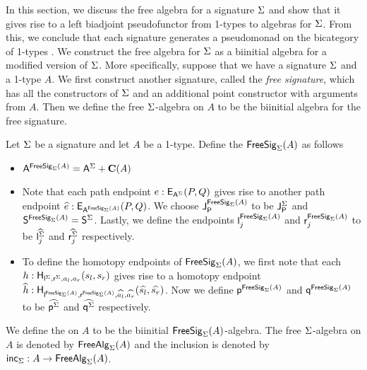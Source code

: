 In this section, we discuss the free algebra for a signature $\sign$ and show that it gives rise to a left biadjoint pseudofunctor from 1-types to algebras for $\sign$.
From this, we conclude that each signature generates a pseudomonad on the bicategory of 1-types \cite{LACK2000179}.
We construct the free algebra for $\sign$ as a biinitial algebra for a modified version of $\sign$.
More specifically, suppose that we have a signature $\sign$ and a 1-type $A$.
We first construct another signature, called the \emph{free signature}, which has all the constructors of $\sign$ and an additional point constructor with arguments from $A$.
Then we define the free $\sign$-algebra on $A$ to be the biinitial algebra for the free signature.

\begin{definition}\label{def:free_alg}
Let $\sign$ be a signature and let $A$ be a 1-type.
Define the  $\freesign{\sign}{A}$ as follows
\begin{itemize}
	\item $\pointconstr[\freesign{\sign}{A}] = \sumP{\pointconstr[\sign]}{\constantP{A}}$
	\item Note that each path endpoint $e : \pathendpoint{\pointconstr[\sign]}{P}{Q}$ gives rise to another path endpoint $\freepath{e} : \pathendpoint{\pointconstr[\freesign{\sign}{A}]}{P}{Q}$.
	We choose $\pathlabel[\freesign{\sign}{A}]$ to be $\pathlabel[\sign]$ and $\patharg[\freesign{\sign}{A}] = \patharg[\sign]$.
	Lastly, we define the endpoints $\pathleft[\freesign{\sign}{A}]_j$ and $\pathright[\freesign{\sign}{A}]_j$ to be $\freepath{\pathleft[\sign]_j}$ and $\freepath{\pathright[\sign]_j}$ respectively.
	\item To define the homotopy endpoints of $\freesign{\sign}{A}$, we first note that each $h : \homotendpoint{\pathleft[\sign]}{\pathright[\sign]}{a_l}{a_r}{s_l}{s_r}$ gives rise to a homotopy endpoint $\freehomot{h} : \homotendpoint{\pathleft[\freesign{\sign}{A}]}{\pathright[\freesign{\sign}{A}]}{\freepath{a_l}}{\freepath{a_r}}{\freepath{s_l}}{\freepath{s_r}}$.
	Now we define $\homotleft[\freesign{\sign}{A}]$ and $\homotright[\freesign{\sign}{A}]$ to be $\freehomot{\homotleft[\sign]}$ and $\freehomot{\homotright[\sign]}$ respectively.
\end{itemize}
We define the  on $A$ to be the biinitial $\freesign{\sign}{A}$-algebra.
The free $\sign$-algebra on $A$ is denoted by $\freealg{\sign}{A}$ and the inclusion is denoted by $\freealginc{\sign} : A \rightarrow \freealg{\sign}{A}$.
\end{definition}

